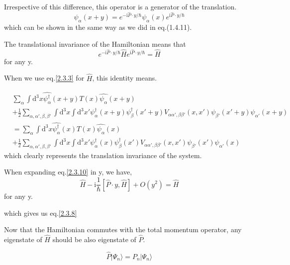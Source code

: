 Irrespective of this difference, this operator is a generator of the translation.
\begin{equation}\label{2.3.9}
\psi_{\alpha}(x+y)=e^{-\mathrm{i}\hat{P}\cdot y/\hbar}\psi_{\alpha}(x)e^{\mathrm{i}\hat{P}\cdot y/\hbar}
\end{equation}
which can be shown in the same way as we did in eq.(1.4.11).

The translational invariance of the Hamiltonian means that 
\begin{equation}\label{2.3.10}
e^{-\mathrm{i}\hat{P}\cdot y/\hbar}\hat{H}e^{\mathrm{i}\hat{P}\cdot y/\hbar}=\hat{H}
\end{equation}
for any y.

When we use eq.\eqref{2.3.3} for $\hat{H}$, this identity means.

\begin{align}
&\sum_{\alpha}\int \mathrm{d}^3x \hat{\psi^{\dagger}_{\alpha}}(x+y)T(x)\hat{\psi_{\alpha}}(x+y)\nonumber \\
&+\frac{1}{2}\sum_{\alpha,\alpha',\beta,\beta'}\int\mathrm{d}^3x\int\mathrm{d}^3x'\psi^{\dagger}_{\alpha}(x+y)\psi^{\dagger}_{\beta}(x'+y)V_{\alpha\alpha',\beta\beta'}(x,x')\psi_{\beta'}(x'+y)\psi_{\alpha'}(x+y) \nonumber \\
&=\sum_{\alpha}\int \mathrm{d}^3x \hat{\psi^{\dagger}_{\alpha}}(x)T(x)\hat{\psi_{\alpha}}(x)\nonumber \\
&+\frac{1}{2}\sum_{\alpha,\alpha',\beta,\beta'}\int\mathrm{d}^3x\int\mathrm{d}^3x'\psi^{\dagger}_{\alpha}(x)\psi^{\dagger}_{\beta}(x')V_{\alpha\alpha',\beta\beta'}(x,x')\psi_{\beta'}(x')\psi_{\alpha'}(x) \nonumber
\end{align}
which clearly represents the translation invariance of the system.

When expanding eq.\eqref{2.3.10} in y, we have, 
\begin{equation}
\hat{H}-\mathrm{i}\frac{1}{\hbar}[\hat{P}\cdot y,\hat{H}]+O(y^2)=\hat{H} \nonumber
\end{equation}
for any y.

which gives us eq.\eqref{2.3.8}

Now that the Hamiltonian commutes with the total momentum operator, any eigenstate of $\hat{H}$ should be also eigenstate of $\hat{P}$.

\begin{equation}\label{2.3.11}
\hat{P}|\Psi_n\rangle=P_n|\Psi_n\rangle
\end{equation}

